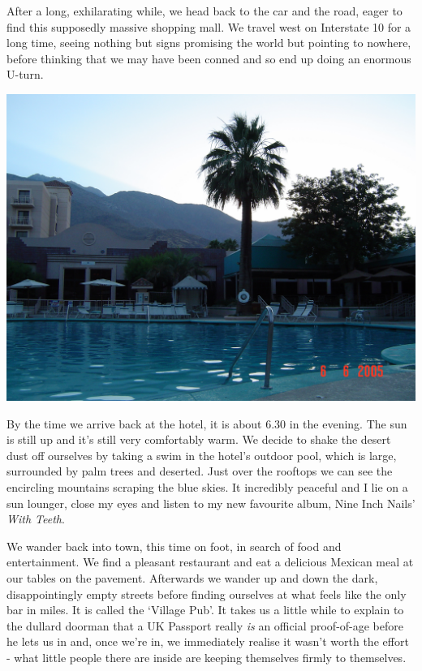 \documentclass[a5paper,titlepage,11pt,draft]{book}
\begin{document}
After a long, exhilarating while, we head back to the car and the road, eager to find this supposedly massive shopping mall.  We travel west on Interstate 10 for a long time, seeing nothing but signs promising the world but pointing to nowhere, before thinking that we may have been conned and so end up doing an enormous U-turn.

\begin{center}\includegraphics[width=\textwidth]{gfx/palmsprings_pool}\end{center}

By the time we arrive back at the hotel, it is about 6.30 in the evening.  The sun is still up and it's still very comfortably warm.  We decide to shake the desert dust off ourselves by taking a swim in the hotel's outdoor pool, which is large, surrounded by palm trees and deserted.  Just over the rooftops we can see the encircling mountains scraping the blue skies.  It incredibly peaceful and I lie on a sun lounger, close my eyes and listen to my new favourite album, Nine Inch Nails' \emph{With Teeth}.

We wander back into town, this time on foot, in search of food and entertainment.  We find a pleasant restaurant and eat a delicious Mexican meal at our tables on the pavement.  Afterwards we wander up and down the dark, disappointingly empty streets before finding ourselves at what feels like the only bar in miles.  It is called the `Village Pub'.  It takes us a little while to explain to the dullard doorman that a UK Passport really \emph{is} an official proof-of-age before he lets us in and, once we're in, we immediately realise it wasn't worth the effort - what little people there are inside are keeping themselves firmly to themselves.
\end{document}
